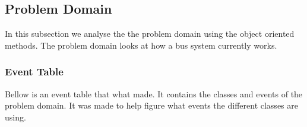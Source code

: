 \subsection{Problem Domain}
In this subsection we analyse the the problem domain using the object oriented methods. The problem domain looks at how a bus system currently works.

\subsubsection{Event Table}

Bellow is an event table that what made. It contains the classes and events of the problem domain. It was made to help figure what events the different classes are using.

\begin{table}[H]
\centering
{}
\end{table}
